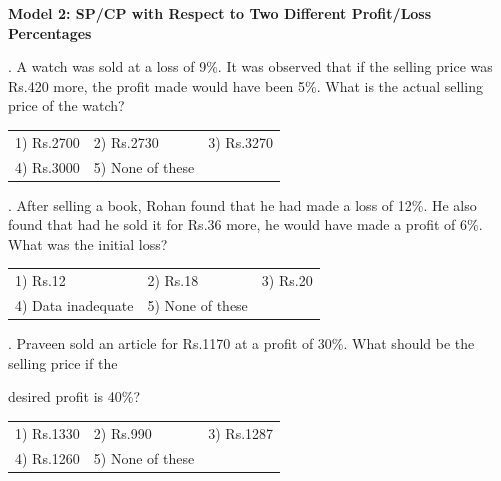 \documentclass{article}
\begin{document}
	\noindent 
	
	\noindent 
	
	\noindent 
	\newpage
	\noindent \textbf{Model 2: SP/CP with Respect to Two Different Profit/Loss Percentages}
	
	\noindent 
	
	.   A watch was sold at a loss of 9\%. It was observed that if the selling price was Rs.420 more, the profit made would have been 5\%. What is the actual selling price of the watch?
	
	\noindent  
	\begin{tabular}{p{1.7in} p{1.6in} p{1.6in}} \\ 
 1) Rs.2700               & 2) Rs.2730        & 3) Rs.3270        \\
4) Rs.3000                     & 5) None of these  \\
\end{tabular}
	
	\noindent 
	
	\noindent 
	
	. After selling a book, Rohan found that he had made a loss of 12\%. He also found that had he sold it for Rs.36 more, he would have made a profit of 6\%. What was the initial loss?
	
	\noindent 
	

		 
	\begin{tabular}{p{1.7in} p{1.6in} p{1.6in}} \\ 
 1) Rs.12  & 2) Rs.18  & 3) Rs.20 
		\\
4) Data inadequate  & 5) None of these  \\
\end{tabular} 
	
	
	
	
	\noindent 
	
	\noindent 
	
	. Praveen sold an article for Rs.1170 at a profit of 30\%. What should be the selling price if the
	
	\noindent 
	
	\noindent desired profit is 40\%?
	
	\noindent 
	
	\noindent  
	\begin{tabular}{p{1.7in} p{1.6in} p{1.6in}} \\ 
 1) Rs.1330               & 2) Rs.990          & 3) Rs.1287        \\
4) Rs.1260        & 5) None of these  \\
\end{tabular}
	
\end{document}
